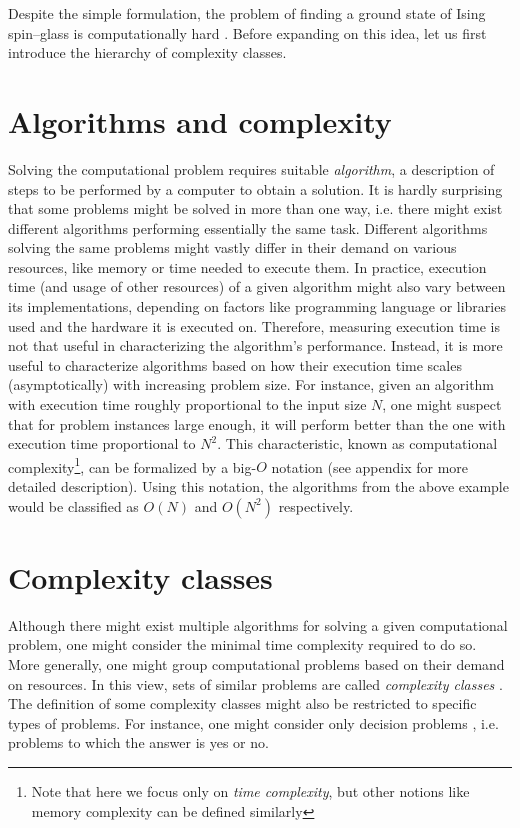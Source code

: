 Despite the simple formulation, the problem of finding a ground state of Ising spin--glass is
computationally hard \cite{barahoma}. Before expanding on this idea, let us first introduce the
hierarchy of complexity classes.

\section{Algorithms and complexity}


Solving the computational problem requires suitable \emph{algorithm}, a description of steps to be
performed by a computer to obtain a solution. It is hardly surprising that some problems might be
solved in more than one way, i.e. there might exist different algorithms performing essentially the
same task. Different algorithms solving the same problems might vastly differ in their demand on
various resources, like memory or time needed to execute them. In practice, execution time (and
usage of other resources) of a given algorithm might also vary between its implementations,
depending on factors like programming language or libraries used and the hardware it is executed on.
Therefore, measuring execution time is not that useful in characterizing the algorithm's
performance.  Instead, it is more useful to characterize algorithms based on how their execution
time scales (asymptotically) with increasing problem size\cite{arora}. For instance, given an
algorithm with execution time roughly proportional to the input size $N$, one might suspect that for
problem instances large enough, it will perform better than the one with execution time proportional
to $N^{2}$. This characteristic, known as computational complexity\footnote{Note that here we focus
only on \emph{time complexity}, but other notions like memory complexity can be defined similarly},
can be formalized by a big-$O$ notation (see appendix for more detailed description). Using this
notation, the algorithms from the above example would be classified as $O(N)$ and $O(N^{2})$
respectively.

\section{Complexity classes}
Although there might exist multiple algorithms for solving a given computational problem, one might
consider the minimal time complexity required to do so. More generally, one might group
computational problems based on their demand on resources. In this view, sets of similar problems
are called \emph{complexity classes} \cite{arora}. The definition of some complexity classes might
also be restricted to specific types of problems. For instance, one might consider only decision
problems \cite{arora}, i.e. problems to which the answer is yes or no.

